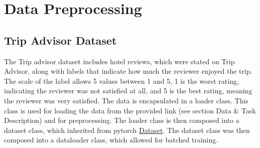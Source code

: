 \documentclass[fleqn,10pt]{SelfArx} %
\begin{document}
\section{Data Preprocessing}
\subsection{Trip Advisor Dataset}
The Trip advisor dataset includes hotel reviews, which were stated on Trip Advisor, along with labels that indicate how much the reviewer enjoyed the trip. The scale of the label allows 5 values between 1 and 5, 1 is the worst rating, indicating the reviewer was not satisfied at all, and 5 is the best rating, meaning the reviewer was very satisfied. 
The data is encapsulated in a loader class. This class is  used for loading the data from the provided link (see section Data \& Task Description) and for preprocessing. The loader class is then composed into a dataset class, which inherited from pytorch  \href{https://pytorch.org/tutorials/beginner/basics/data_tutorial.html}{Dataset}. The dataset class was then composed into a dataloader class, which allowed for batched training. 
\end{document}
